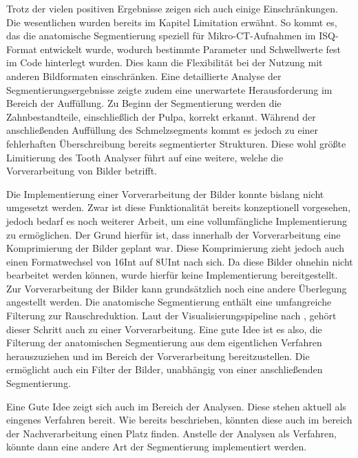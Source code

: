 Trotz der vielen positiven Ergebnisse zeigen sich auch einige Einschränkungen.
Die wesentlichen wurden bereits im Kapitel Limitation erwähnt. So kommt es, das
die anatomische Segmentierung speziell für Mikro-\ac{CT}-Aufnahmen im \ac{ISQ}-Format
entwickelt wurde, wodurch bestimmte Parameter und Schwellwerte fest im Code
hinterlegt wurden. Dies kann die Flexibilität bei der Nutzung mit anderen Bildformaten
einschränken. Eine detaillierte Analyse der Segmentierungsergebnisse zeigte
zudem eine unerwartete Herausforderung im Bereich der Auffüllung. Zu Beginn der Segmentierung
werden die Zahnbestandteile, einschließlich der Pulpa, korrekt erkannt. Während
der anschließenden Auffüllung des Schmelzsegments kommt es jedoch zu einer
fehlerhaften Überschreibung bereits segmentierter Strukturen. Diese wohl größte Limitierung
des Tooth Analyser führt auf eine weitere, welche die Vorverarbeitung von Bilder
betrifft.

Die Implementierung einer Vorverarbeitung der Bilder konnte bislang nicht
umgesetzt werden. Zwar ist diese Funktionalität bereits konzeptionell vorgesehen,
jedoch bedarf es noch weiterer Arbeit, um eine vollumfängliche Implementierung zu
ermöglichen. Der Grund hierfür ist, dass innerhalb der Vorverarbeitung eine Komprimierung
der Bilder geplant war. Diese Komprimierung zieht jedoch auch einen
Formatwechsel von \ac{16Int} auf \ac{8UInt} nach sich. Da diese Bilder ohnehin nicht
bearbeitet werden können, wurde hierfür keine Implementierung bereitgestellt. Zur
Vorverarbeitung der Bilder kann grundsätzlich noch eine andere Überlegung angestellt
werden. Die anatomische Segmentierung enthält eine umfangreiche Filterung zur
Rauschreduktion. Laut der Visualisierungspipeline nach \citet[S.~50]{handels2000},
gehört dieser Schritt auch zu einer Vorverarbeitung. Eine gute Idee ist es also,
die Filterung der anatomischen Segmentierung aus dem eigentlichen Verfahren herauszuziehen
und im Bereich der Vorverarbeitung bereitzustellen. Die ermöglicht auch ein
Filter der Bilder, unabhängig von einer anschließenden Segmentierung.

Eine Gute Idee zeigt sich auch im Bereich der Analysen. Diese stehen aktuell als
eingenes Verfahren bereit. Wie bereits beschrieben, könnten diese auch im
bereich der Nachverarbeitung einen Platz finden. Anstelle der Analysen als Verfahren,
könnte dann eine andere Art der Segmentierung implementiert werden.

